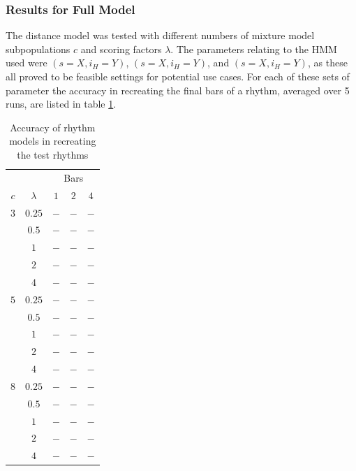 \documentclass[ author={Stephen Livermore-Tozer},
				supervisor={Dr. Peter Flach},
				degree={MEng},
				title={Algorithmic Co-composition Using Machine Learning},
				subtitle={},
				type={research},
				year={2016} ]{dissertation}
\begin{document}
	\subsubsection{Results for Full Model}
	
	The distance model was tested with different numbers of mixture model subpopulations $c$ and scoring factors $\lambda$. The parameters relating to the HMM used were $(s = X, i_H = Y)$, $(s = X, i_H = Y)$, and $(s = X, i_H = Y)$, as these all proved to be feasible settings for potential use cases. For each of these sets of parameter the accuracy in recreating the final bars of a rhythm, averaged over 5 runs, are listed in table \ref{tab:rhythm-model-results}.
	
	\begin{table}[htp]
		\begin{center}
			\begin{tabular}{ccccc}
				\toprule
				& & \multicolumn{3}{c}{Bars}\\
				\cline{3-5}
				$c$ & $\lambda$ & $1$ & $2$ & $4$\\
				\hline
				$3$ & $0.25$ & $-$ & $-$ & $-$\\
				& $0.5$      & $-$ & $-$ & $-$\\
				& $1$        & $-$ & $-$ & $-$\\
				& $2$        & $-$ & $-$ & $-$\\
				& $4$        & $-$ & $-$ & $-$\\
				$5$ & $0.25$ & $-$ & $-$ & $-$\\
				& $0.5$      & $-$ & $-$ & $-$\\
				& $1$        & $-$ & $-$ & $-$\\
				& $2$        & $-$ & $-$ & $-$\\
				& $4$        & $-$ & $-$ & $-$\\
				$8$ & $0.25$ & $-$ & $-$ & $-$\\
				& $0.5$      & $-$ & $-$ & $-$\\
				& $1$        & $-$ & $-$ & $-$\\
				& $2$        & $-$ & $-$ & $-$\\
				& $4$        & $-$ & $-$ & $-$\\
				\bottomrule
			\end{tabular}
		\end{center}
		\caption{Accuracy of rhythm models in recreating the test rhythms}
		\label{tab:rhythm-model-results}
	\end{table}
	
\end{document}
